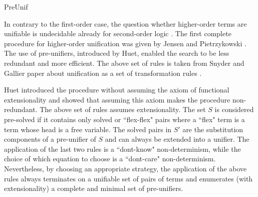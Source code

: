 \begin{entry}{PreUnif}
 \begin{history}
   In contrary to the first-order case,
   the question whether higher-order terms are unifiable is
   undecidable already for second-order logic \cite{goldfarb81tcs}.
   The first complete procedure for higher-order unification was given by
   Jensen and Pietrzykowski \cite{jensen76tcs}.
   The use of pre-unifiers, introduced by Huet, enabled the search to
   be less redundant and more efficient.
   The above set of rules is taken from Snyder and Gallier paper about unification
   as a set of transformation rules \cite{Snyder1989101}.
 \end{history}

\begin{technicalities}
  Huet \cite{huet75tcs} introduced the procedure without assuming
  the axiom of functional extensionality and showed that assuming this axiom
  makes the procedure non-redundant.
  The above set of rules assumes extensionality.
The set $S$ is considered
   pre-solved if it contains only solved or ``flex-flex" pairs where a ``flex" term
   is a term whose head is a free variable.
   The solved pairs in $S'$ are the substitution components \cite{Robinson1965JACM} of a
   pre-unifier of $S$ and can always be extended into a unifier.
  The application of the last two rules is
  a ``dont-know" non-determinism, while the choice of which equation to choose
  is a ``dont-care" non-determinism. Nevertheless, by choosing an appropriate strategy,
   the application of the above rules always terminates on a unifiable set of pairs of terms
   and enumerates (with extensionality) a complete and minimal set of pre-unifiers.
 \end{technicalities}



%
%
%
%
%
%
%
%




\end{entry}
